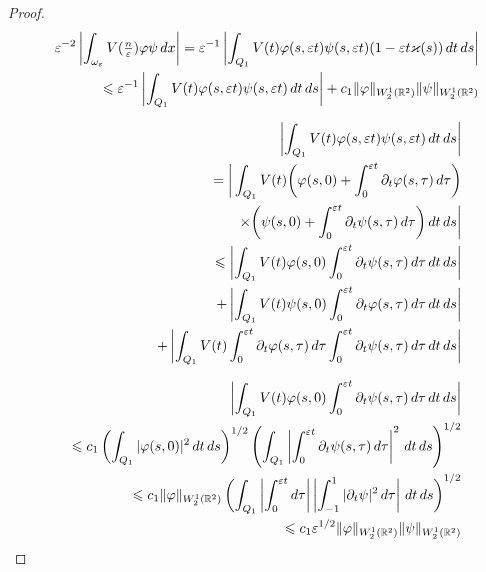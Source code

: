 \begin{proof}
\begin{eqnarray}\nonumber
 &&\varepsilon^{-2}\left|\int_{\omega_\varepsilon}V(\textstyle\frac n{\varepsilon})\varphi \psi\,dx\right|=
  \varepsilon^{-1}\left|\int_{Q_1}V(t)\varphi(s,\varepsilon t) \psi(s,\varepsilon t)
(1-\varepsilon t \varkappa(s) )\,dt\,ds\right|\\\nonumber
&&\leqslant \varepsilon^{-1}\left|\int_{Q_1}V(t)\varphi(s,\varepsilon t) \psi(s,\varepsilon t)
\,dt\,ds\right|+c_1\|\varphi\|_{W_2^1(\mathbb R^2)}\|\psi\|_{W_2^1(\mathbb R^2)}
\end{eqnarray}

\begin{eqnarray}\nonumber
&&\left|\int_{Q_1}V(t)\phi(s,\eps t) \psi(s,\eps t)
\,dt\,ds\right|\\\nonumber
&&= \bigg|\int_{Q_1}V(t)\bigg(\phi(s,0)
+\int_0^{\eps t}\partial_t\phi(s,\tau)\,d \tau\bigg)\\\nonumber
&&\kern120pt\times\bigg(\psi(s,0)+\int_0^{\eps t}\partial_t\psi(s,\tau)\,d \tau\bigg)\,dt\,ds\bigg|\\\nonumber
&&\leq  \left|\int_{Q_1}V(t)
\phi(s,0)\int_0^{\eps t}\partial_t\psi(s,\tau)\,d \tau\,dt\,ds\right|\\\nonumber
&&
+\left|\int_{Q_1}V(t)
\psi(s,0)\int_0^{\eps t}\partial_t\phi(s,\tau)\,d \tau\,dt\,ds\right|\\\nonumber
&&
+\left|\int_{Q_1}V(t)\int_0^{\eps t}\partial_t\phi(s,\tau)\,d \tau\int_0^{\eps t}\partial_t\psi(s,\tau)\,d \tau\,dt\,ds\right|
\end{eqnarray}



\begin{eqnarray}
 &&\left|\int_{Q_1}V(t)
\varphi(s,0)\int_0^{\varepsilon t}\partial_t\psi(s,\tau)\,d \tau\,dt\,ds\right|\\\nonumber
&&\leqslant c_1 \left(\int_{Q_1}|\varphi(s,0)|^2\,dt\,ds\right)^{1/2}
\left(\int_{Q_1}\left|\int_0^{\varepsilon t}\partial_t\psi(s,\tau)\,d \tau\right|^2\,dt\,ds\right)^{1/2}\\\nonumber
&&\leqslant c_1 \|\varphi\|_{W_2^1(\mathbb R^2)}
\left(\int_{Q_1}
\left|\int_0^{\varepsilon t}d \tau\right|
\left|\int_{-1}^{1}|\partial_t\psi|^2\,d \tau\right|\,dt\,ds\right)^{1/2}\\\nonumber
&&\leqslant c_1\varepsilon^{1/2} \|\varphi\|_{W_2^1(\mathbb R^2)}\|\psi\|_{W_2^1(\mathbb R^2)}
\end{eqnarray}

\end{proof}













